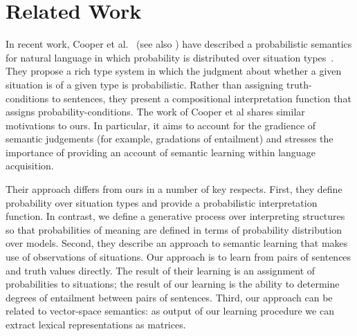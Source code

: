 \documentclass[11pt]{article}
\theoremstyle{definition}
\begin{document}


\section{Related Work}


In recent work, Cooper et al.~\cite{Cooper:14} (see also
\cite{Eijck:12}) have described a probabilistic semantics for natural language in which probability is distributed over situation types~\cite{Barwise:83}. They propose a rich type system in which the judgment about whether a given situation is of a given type is probabilistic. Rather than assigning truth-conditions to sentences, they present a compositional interpretation function that assigns probability-conditions. The work of Cooper et al shares similar motivations to ours. In particular, it aims to account for the gradience of semantic judgements (for example, gradations of entailment) and stresses the importance of providing an account of semantic learning within language acquisition.

Their approach differs from ours in a number of key respects. First, they define probability over situation types and provide a probabilistic interpretation function. In contrast, we define a generative process over interpreting structures so that probabilities of meaning are defined in terms of probability distribution over models. Second, they describe an approach to semantic learning that makes use of observations of situations. Our approach is to learn from pairs of sentences and truth values directly. The result of their learning is an assignment of probabilities to situations; the result of our learning is the ability to determine degrees of entailment between pairs of sentences. Third, our approach can be related to vector-space semantics: as output of our learning procedure we can extract lexical representations as matrices.
\end{document}
